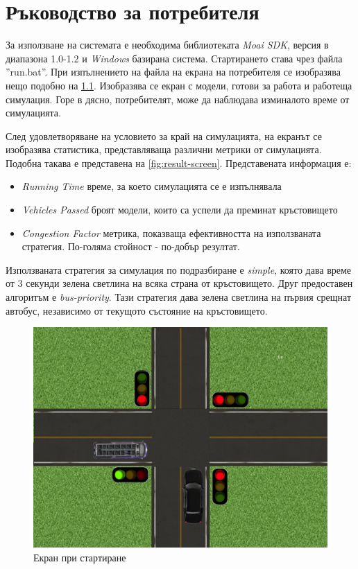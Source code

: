 \chapter{Ръководство за потребителя}
	За използване на системата е необходима библиотеката \emph{Moai SDK},
	версия в диапазона 1.0-1.2 и \emph{Windows} базирана система. Стартирането
	става чрез файла ''run.bat''. При изпълнението на файла на екрана на потребителя
	се изобразява нещо подобно на \ref{fig:simulation-screen}. Изобразява се
	екран с модели, готови за работа и работеща симулация. Горе в дясно, потребителят,
	може да наблюдава изминалото време от симулацията.
	
	След удовлетворяване на условието за край на симулацията, на екранът се изобразява
	статистика, представляваща различни метрики от симулацията. Подобна такава е представена
	на \ref{fig:result-screen}. Представената информация е:
	
	\begin{itemize}
		\item \emph{Running Time} време, за което симулацията се е изпълнявала
		\item \emph{Vehicles Passed} броят модели, които са успели да преминат кръстовището
		\item \emph{Congestion Factor} метрика, показваща ефективността на използваната стратегия. 
			По-голяма стойност - по-добър резултат.
	\end{itemize}
	
	Използваната стратегия за симулация по подразбиране е \emph{simple}, която дава
	време от 3 секунди зелена светлина на всяка страна от кръстовището. Друг предоставен
	алгоритъм е \emph{bus-priority}. Тази стратегия дава зелена светлина на първия срещнат автобус,
	независимо от текущото състояние на кръстовището.
	
	\begin{figure}[htb]
		\centering
		\includegraphics[scale=0.4]{assets/simulation.jpg}
		\caption{Екран при стартиране}
		\label{fig:simulation-screen}
	\end{figure}
	
